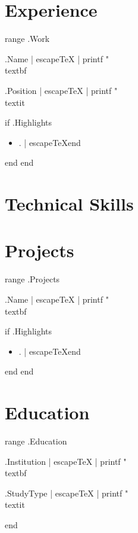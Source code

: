 \documentclass[11pt,a4paper]{article}
\begin{document}
\section*{Experience}
{{range .Work}}
{{.Name | escapeTeX | printf "\\textbf{%
{{.Position | escapeTeX | printf "\\textit{%
{{if .Highlights}}
\begin{itemize}
  \setlength\itemsep{0pt}
  {{range .Highlights}}\item {{. | escapeTeX}}{{end}}
\end{itemize}
{{end}}
{{end}}

\section*{Technical Skills}


\section*{Projects}
{{range .Projects}}
{{.Name | escapeTeX | printf "\\textbf{%
{{if .Highlights}}
\begin{itemize}
  \setlength\itemsep{-0.25em}
  {{range .Highlights}}\item {{. | escapeTeX}}{{end}}
\end{itemize}
{{end}}
{{end}}

\section*{Education}
{{range .Education}}
{{.Institution | escapeTeX | printf "\\textbf{%
{{.StudyType | escapeTeX | printf "\\textit{%
{{end}}

}}}}}}}}}}}}}}}
\end{document}

